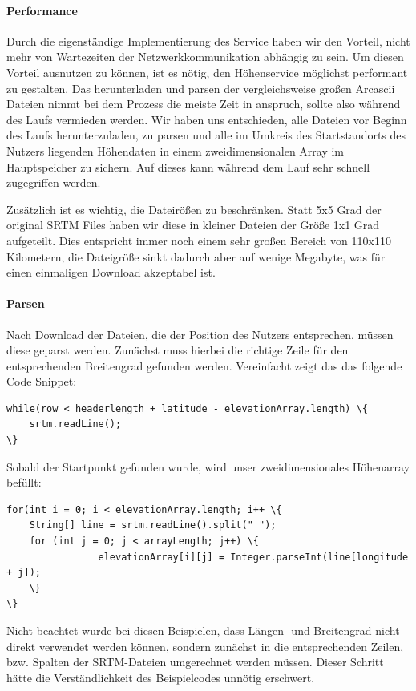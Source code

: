 \paragraph{Performance}
Durch die eigenständige Implementierung des Service haben wir den Vorteil, nicht mehr von Wartezeiten der Netzwerkkommunikation abhängig zu sein. Um diesen Vorteil ausnutzen zu können, ist es nötig, den Höhenservice möglichst performant zu gestalten. Das herunterladen und parsen der vergleichsweise großen Arcascii Dateien nimmt bei dem Prozess die meiste Zeit in anspruch, sollte also während des Laufs vermieden werden. Wir haben uns entschieden, alle Dateien vor Beginn des Laufs herunterzuladen, zu parsen und alle im Umkreis des Startstandorts des Nutzers liegenden Höhendaten in einem zweidimensionalen Array im Hauptspeicher zu sichern. Auf dieses kann während dem Lauf sehr schnell zugegriffen werden.

Zusätzlich ist es wichtig, die Dateirößen zu beschränken. Statt 5x5 Grad der original SRTM Files haben wir diese in kleiner Dateien der Größe 1x1 Grad aufgeteilt. Dies entspricht immer noch einem sehr großen Bereich von 110x110 Kilometern, die Dateigröße sinkt dadurch aber auf wenige Megabyte, was für einen einmaligen Download akzeptabel ist.
\paragraph{Parsen}
Nach Download der Dateien, die der Position des Nutzers entsprechen, müssen diese geparst werden. Zunächst muss hierbei die richtige Zeile für den entsprechenden Breitengrad gefunden werden. Vereinfacht zeigt das das folgende Code Snippet:
\lstset{language=java}
\begin{lstlisting}[frame=htrbl, caption={Finden der ersten benötigten Zeile}, breaklines=true]
while(row < headerlength + latitude - elevationArray.length) \{
	srtm.readLine();
\}
\end{lstlisting}
Sobald der Startpunkt gefunden wurde, wird unser zweidimensionales Höhenarray befüllt:
\lstset{language=java}
\begin{lstlisting}[frame=htrbl, caption={Füllen des Höhenarrays}, breaklines=true]
for(int i = 0; i < elevationArray.length; i++ \{
	String[] line = srtm.readLine().split(" ");
	for (int j = 0; j < arrayLength; j++) \{
                elevationArray[i][j] = Integer.parseInt(line[longitude + j]);
	\}
\}
\end{lstlisting}
Nicht beachtet wurde bei diesen Beispielen, dass Längen- und Breitengrad nicht direkt verwendet werden können, sondern zunächst in die entsprechenden Zeilen, bzw. Spalten der SRTM-Dateien umgerechnet werden müssen. Dieser Schritt hätte die Verständlichkeit des Beispielcodes unnötig erschwert.

